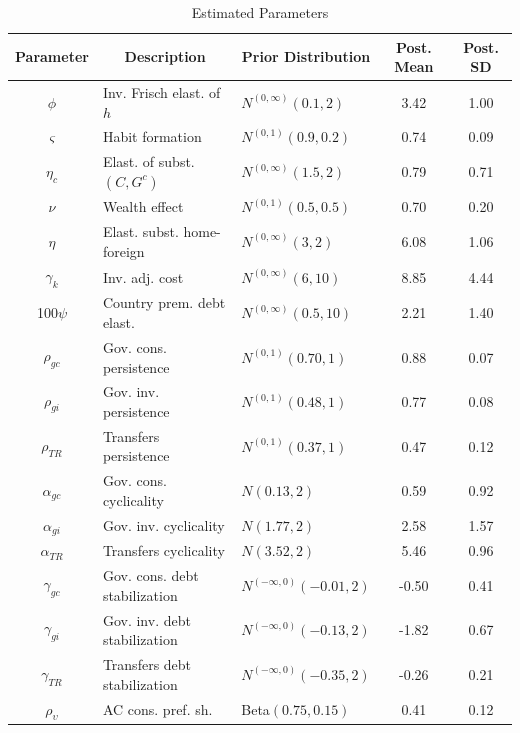 \documentclass[12pt]{article}
\begin{document}
\begin{table}
\begin{footnotesize}
    \centering
    \caption{Estimated Parameters}
    \label{table:priorposterior}
    \begin{tabular}{c l | l c c}
    \hline \hline
    Parameter & \multicolumn{1}{c}{Description} & \multicolumn{1}{c}{Prior Distribution} & Post. Mean & Post. SD \\
    \hline 
    $\phi$ & Inv. Frisch elast. of $h$ & $N^{(0,\infty)}\left(0.1,2\right)$ & 3.42 & 1.00  \\
    $\varsigma$ & Habit formation & $N^{(0,1)}\left(0.9,0.2\right)$ & 0.74 & 0.09 \\
    $\eta_c$ & Elast. of subst. $(C,G^c)$ & $N^{(0,\infty)}\left(1.5,2\right)$ & 0.79 & 0.71 \\
    $\nu$ & Wealth effect & $N^{(0,1)}\left(0.5,0.5\right)$ & 0.70 & 0.20 \\
    $\eta$ & Elast. subst. home-foreign & $N^{(0,\infty)}\left(3,2\right)$ & 6.08 & 1.06 \\
    $\gamma_k$ & Inv. adj. cost & $N^{(0,\infty)}\left(6,10\right)$ & 8.85 & 4.44  \\
    100$\psi$ & Country prem. debt elast. & $N^{(0,\infty)}\left(0.5,10\right)$ & 2.21 & 1.40 \\
    \hline
    $\rho_{gc}$ & Gov. cons. persistence & $N^{(0,1)}\left(0.70,1\right)$ & 0.88 & 0.07 \\
    $\rho_{gi}$ & Gov. inv. persistence & $N^{(0,1)}\left(0.48,1\right)$ & 0.77 & 0.08 \\
    $\rho_{TR}$ & Transfers persistence & $N^{(0,1)}\left(0.37,1\right)$ & 0.47 & 0.12 \\
    $\alpha_{gc}$ & Gov. cons. cyclicality & $N\left(0.13,2\right)$ & 0.59 & 0.92 \\
    $\alpha_{gi}$ & Gov. inv. cyclicality & $N\left(1.77,2\right)$ & 2.58 & 1.57 \\
    $\alpha_{TR}$ & Transfers cyclicality & $N\left(3.52,2\right)$ & 5.46 & 0.96 \\
    $\gamma_{gc}$ & Gov. cons. debt stabilization & $N^{(-\infty,0)}\left(-0.01,2\right)$ & -0.50 & 0.41 \\
    $\gamma_{gi}$ & Gov. inv. debt stabilization & $N^{(-\infty,0)}\left(-0.13,2\right)$ & -1.82 & 0.67 \\
    $\gamma_{TR}$ & Transfers debt stabilization & $N^{(-\infty,0)}\left(-0.35,2\right)$ & -0.26  & 0.21 \\
    \hline
    $\rho_{\upsilon}$ & AC cons. pref. sh. & Beta$\left(0.75,0.15\right)$ & 0.41 & 0.12 \\

\end{tabular}
\end{footnotesize}
\end{table}
\end{document}

